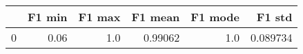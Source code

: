 \begin{tabular}{lrrrrr}
\toprule
{} &  F1 min &  F1 max &  F1 mean &  F1 mode &    F1 std \\
\midrule
0 &    0.06 &     1.0 &  0.99062 &      1.0 &  0.089734 \\
\bottomrule
\end{tabular}
